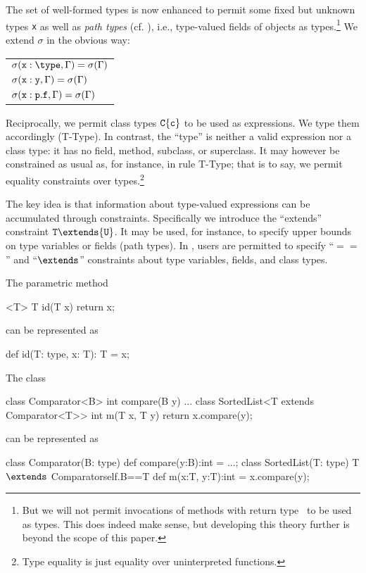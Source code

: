 The set of well-formed types is now enhanced to permit some fixed but unknown
types {\tt x} as well as \emph{path types} (cf. \cite{scala}),
i.e., type-valued fields of objects as types.\footnote{But we will not permit invocations of methods with return type \type\ to be 
used as types. This does indeed make sense, but developing
this theory further is beyond the scope of this paper.} We extend $\sigma$ in the obvious way:
%
\begin{center}
\begin{tabular}{l}
$	\sigma({\tt x}:\type, \Gamma)=\sigma(\Gamma)$\\
$\sigma({\tt x}:{\tt y}, \Gamma)=\sigma(\Gamma)$\\
$\sigma({\tt x}:{\tt p}.{\tt f}, \Gamma)=\sigma(\Gamma)$
\end{tabular}
\end{center}
%
Reciprocally, we permit class types ${\tt C}\{{\tt c}\}$ to be
used as expressions. We type them accordingly ({\sc T-Type}). In
contrast, the ``type'' \type{} is neither a valid expression nor
a class type: it has no field, method, subclass, or superclass.
It may however be constrained as usual as, for instance, in rule
{\sc T-Type}; that is to say, we permit equality constraints over types.\footnote{Type equality is just equality over uninterpreted functions.}

The key idea is that information about type-valued expressions can
be accumulated through constraints. Specifically we introduce 
the ``extends'' constraint ${\tt T}\extends{\tt U}$. It may be used, for
instance, to specify upper bounds on type variables or fields (path
types). In \FXG{}, users are permitted to specify ``$==$'' and ``$\extends$'' constraints
about type variables, fields, and class types.

\begin{example}
The \FGJ{} parametric method

\begin{xten} 
<T> T id(T x) { return x; }
\end{xten}
\noindent can be represented as
\begin{xten} 
def id(T: type, x: T): T = x;
\end{xten}
\end{example}

\begin{example}
\noindent The \FGJ{} class 
\begin{xten} 
class Comparator<B> {
  int compare(B y) { ... } }
class SortedList<T extends Comparator<T>> { 
  int m(T x, T y) { return x.compare(y); } }
\end{xten}
\noindent can be represented as
\begin{xtenmath} 
class Comparator(B: type) {
  def compare(y:B):int = ...; }
class SortedList(T: type)
    {T $\extends$ Comparator{self.B==T}} { 
  def m(x:T, y:T):int = x.compare(y); }
\end{xtenmath}
\end{example}

